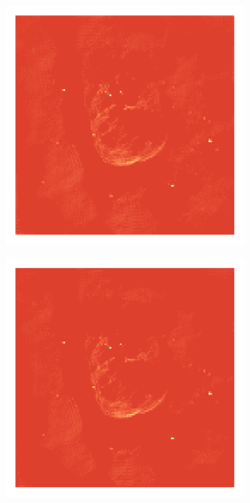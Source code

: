 \begin{figure}[h]
\begin{subfigure}[b]{0.24\linewidth}
	\end{subfigure}
	\begin{subfigure}[b]{0.24\linewidth}
		\includegraphics[width=\linewidth, trim={18px 19px 18px 18px}, clip]{./chapters/05.results/g55/positive_deconv_model.png}
	\end{subfigure}
	\begin{subfigure}[b]{0.24\linewidth}
		\includegraphics[width=\linewidth, trim={18px 19px 18px 18px}, clip]{./chapters/05.results/g55/L1_model.png}
	\end{subfigure}
	

\end{figure}
